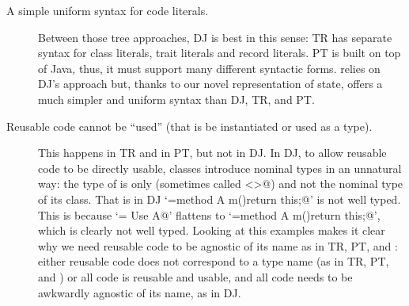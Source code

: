 \begin{description}
\item[A simple uniform syntax for code literals.]
Between those tree approaches, DJ is best in this sense: TR has separate syntax for class literals, trait literals and record literals.
PT is built on top of Java, thus, it must support many different syntactic forms.
\name relies on DJ's approach but,
thanks to our novel representation of state, \name offers a much simpler and uniform syntax than
DJ, TR, and PT.
\item[Reusable code cannot be ``used'' (that is be instantiated or used as a type).]
This happens in TR and in PT, but not in DJ. In DJ, to allow reusable code to be directly 
usable, 
classes introduce nominal types in an unnatural way: the type of
\Q@this@ is only \Q@This@ (sometimes called \Q@<>@) and not the
nominal type of its class. 
That is in DJ 
`\Q@A={method A m(){return this;}}@' is not well typed. This is because
`\Q@B= Use A@' flattens to `\Q@B={method A m(){return this;}}@', which is clearly not well typed.
Looking at this examples makes it clear
 why we need reusable code to be agnostic of its name as in  TR, PT, and \name:
either reusable code does  not correspond to a type name (as in TR, PT, and \name)
or all code is reusable and usable, and all code needs to be awkwardly agnostic of its name, as in DJ.


\end{description}
